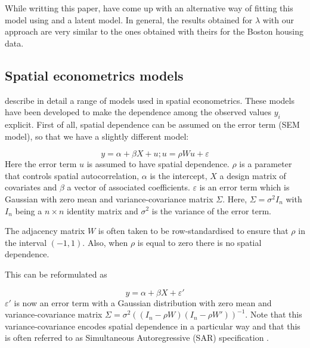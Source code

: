 \documentclass[article]{jss}
\begin{document}
While writting this paper, \citet{LeeMitchell:2013} have come up with an
alternative way of fitting this model using  and a 
latent model. In general, the results obtained for $\lambda$ with our approach
are very similar to the ones obtained with theirs for the Boston housing data.








\subsection{Spatial econometrics models}

\citet{LeSagePace:2009} describe in detail a range of models used in spatial
econometrics. These models have been developed to make the
dependence among the observed values $y_i$ explicit. First of all, spatial dependence
can be assumed on the error term (SEM model), so that we have a slightly different model:

\begin{equation}
y= \alpha+\beta X +u; u=\rho W u+\varepsilon
\end{equation}
\noindent
Here the error term $u$ is assumed to have spatial dependence.  $\rho$ is a
parameter that controls spatial autocorrelation, $\alpha$ is the intercept, $X$
a design matrix of covariates and $\beta$ a vector of associated coefficients.
$\varepsilon$ is an error term which is Gaussian with zero mean and
variance-covariance matrix $\Sigma$. Here, $\Sigma = \sigma^2 I_n$ with $I_n$
being a $n\times n$ identity matrix and $\sigma^2$ is the variance of the error
term.


The adjacency matrix $W$ is often taken to be row-standardised \citep[see, for
example,][]{Haining:2003} to ensure that $\rho$ in the interval $(-1, 1)$.
Also, when $\rho$ is equal to zero there is no spatial dependence.

This can be reformulated as

\begin{equation}
y= \alpha+\beta X+\varepsilon'
\end{equation}
\noindent
$\varepsilon '$ is now an error term with a Gaussian distribution with zero
mean and variance-covariance matrix $\Sigma=\sigma^2((I_n-\rho W)(I_n-\rho W'))^{-1}$.
Note that this variance-covariance encodes spatial dependence in a particular
way and that this is often referred to as Simultaneous Autoregressive (SAR)
specification \citep[see, for example,][]{cressie:1993}.%
\end{document}
